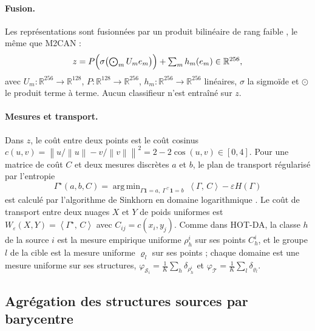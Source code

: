 \documentclass[11pt,a4paper]{article}
\theoremstyle{definition}
\theoremstyle{remark}
\newcommand{\norm}[1]{\left\lVert #1 \right\rVert}
\newcommand{\ip}[2]{\left\langle #1,\, #2 \right\rangle}
\newcommand{\R}{\mathbb{R}}
\newcommand{\indicator}{\mathbf{1}}
\DeclareMathOperator*{\argmin}{arg\,min}
\newcommand{\Src}{\mathcal{S}}
\newcommand{\Tgt}{\mathcal{T}}
\newcommand{\Wass}{W_{\varepsilon}}
\begin{document}
\paragraph{Fusion.}
Les représentations sont fusionnées par un produit bilinéaire de rang faible \citep{kim2017mlb}, le même que M2CAN :
\begin{equation}\label{eq-mlb}
  z = P\Bigl(\sigma\bigl(\textstyle\bigodot_{m} U_m e_m\bigr)\Bigr) + \sum_{m} h_m(e_m) \in \R^{256},
\end{equation}
avec $U_m \colon \R^{256} \to \R^{128}$, $P \colon \R^{128} \to \R^{256}$, $h_m \colon \R^{256} \to \R^{256}$ linéaires,
$\sigma$ la sigmoïde et $\odot$ le produit terme à terme. Aucun classifieur n'est entraîné sur $z$.

\paragraph{Mesures et transport.}
Dans $z$, le coût entre deux points est le coût cosinus
$c(u, v) = \norm{u / \norm{u} - v / \norm{v}}^2 = 2 - 2\cos(u, v) \in [0, 4]$. Pour une matrice de coût $C$ et deux
mesures discrètes $a$ et $b$, le plan de transport régularisé par l'entropie
\begin{equation}\label{eq-sinkhorn}
  \Gamma^\star(a, b, C) = \argmin_{\Gamma \indicator = a,\ \Gamma^\top \indicator = b}\ \ip{\Gamma}{C} - \varepsilon H(\Gamma)
\end{equation}
est calculé par l'algorithme de Sinkhorn en domaine logarithmique \citep{cuturi2013sinkhorn}. Le coût de transport
entre deux nuages $X$ et $Y$ de poids uniformes est $\Wass(X, Y) = \ip{\Gamma^\star}{C}$ avec $C_{ij} = c(x_i, y_j)$.
Comme dans HOT-DA, la classe $h$ de la source $i$ est la mesure empirique uniforme $\rho^i_h$ sur ses points
$C^i_h$, et le groupe $l$ de la cible est la mesure uniforme $\varrho_l$ sur ses points ; chaque domaine est une mesure
uniforme sur ses structures, $\varphi_{\Src_i} = \frac1K \sum_h \delta_{\rho^i_h}$ et
$\varphi_\Tgt = \frac1K \sum_l \delta_{\varrho_l}$.

\subsection{Agrégation des structures sources par barycentre}\label{sec-barycentre}
\end{document}
